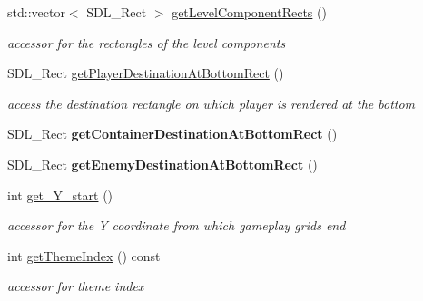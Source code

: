 \begin{DoxyCompactItemize}
std\+::vector$<$ S\+D\+L\+\_\+\+Rect $>$ \hyperlink{class_level_editor_a90c5ea5d07250f1fdaf5a4fec8c63f95}{get\+Level\+Component\+Rects} ()
\begin{DoxyCompactList}\small\item\em accessor for the rectangles of the level components \end{DoxyCompactList}\item 
\hypertarget{class_level_editor_a7eee89b657a94c1ec527e6cbbcd36c88}{}\label{class_level_editor_a7eee89b657a94c1ec527e6cbbcd36c88} 
S\+D\+L\+\_\+\+Rect \hyperlink{class_level_editor_a7eee89b657a94c1ec527e6cbbcd36c88}{get\+Player\+Destination\+At\+Bottom\+Rect} ()
\begin{DoxyCompactList}\small\item\em access the destination rectangle on which player is rendered at the bottom \end{DoxyCompactList}\item 
\hypertarget{class_level_editor_aa903012cca49d6ca806d675f09ab45c7}{}\label{class_level_editor_aa903012cca49d6ca806d675f09ab45c7} 
S\+D\+L\+\_\+\+Rect {\bfseries get\+Container\+Destination\+At\+Bottom\+Rect} ()
\item 
\hypertarget{class_level_editor_aae0552588840ef9557d94c97c7e08124}{}\label{class_level_editor_aae0552588840ef9557d94c97c7e08124} 
S\+D\+L\+\_\+\+Rect {\bfseries get\+Enemy\+Destination\+At\+Bottom\+Rect} ()
\item 
\hypertarget{class_level_editor_aeeee371a1e351af567103e535e4eadf4}{}\label{class_level_editor_aeeee371a1e351af567103e535e4eadf4} 
int \hyperlink{class_level_editor_aeeee371a1e351af567103e535e4eadf4}{get\+\_\+\+Y\+\_\+start} ()
\begin{DoxyCompactList}\small\item\em accessor for the Y coordinate from which gameplay grids end \end{DoxyCompactList}\item 
\hypertarget{class_level_editor_aa52b52d95742ff2f9b23bc95482b1336}{}\label{class_level_editor_aa52b52d95742ff2f9b23bc95482b1336} 
int \hyperlink{class_level_editor_aa52b52d95742ff2f9b23bc95482b1336}{get\+Theme\+Index} () const
\begin{DoxyCompactList}\small\item\em accessor for theme index \end{DoxyCompactList}\item 
\hypertarget{class_level_editor_ae60797218578c738c78d56d33971f113}{}\label{class_level_editor_ae60797218578c738c78d56d33971f113} 

\end{DoxyCompactItemize}
